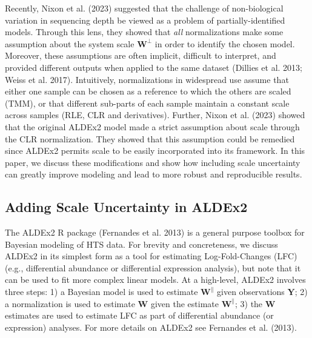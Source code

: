 \documentclass[
]{article}
\begin{document}
Recently, Nixon et al. (2023) suggested that the challenge of
non-biological variation in sequencing depth be viewed as a problem of
partially-identified models. Through this lens, they showed that
\emph{all} normalizations make some assumption about the system scale
\(\mathbf{W}^{\perp}\) in order to identify the chosen model. Moreover,
these assumptions are often implicit, difficult to interpret, and
provided different outputs when applied to the same dataset (Dillies et
al. 2013; Weiss et al. 2017). Intuitively, normalizations in widespread
use assume that either one sample can be chosen as a reference to which
the others are scaled (TMM), or that different sub-parts of each sample
maintain a constant scale across samples (RLE, CLR and derivatives).
Further, Nixon et al. (2023) showed that the original ALDEx2 model made
a strict assumption about scale through the CLR normalization. They
showed that this assumption could be remedied since ALDEx2 permits scale
to be easily incorporated into its framework. In this paper, we discuss
these modifications and show how including scale uncertainty can greatly
improve modeling and lead to more robust and reproducible results.

\hypertarget{adding-scale-uncertainty-in-aldex2}{%
\subsection{Adding Scale Uncertainty in
ALDEx2}\label{adding-scale-uncertainty-in-aldex2}}

The ALDEx2 R package (Fernandes et al. 2013) is a general purpose
toolbox for Bayesian modeling of HTS data. For brevity and concreteness,
we discuss ALDEx2 in its simplest form as a tool for estimating
Log-Fold-Changes (LFC) (e.g., differential abundance or differential
expression analysis), but note that it can be used to fit more complex
linear models. At a high-level, ALDEx2 involves three steps: 1) a
Bayesian model is used to estimate \(\mathbf{W}^{\parallel}\) given
observations \(\mathbf{Y}\); 2) a normalization is used to estimate
\(\mathbf{W}\) given the estimate \(\mathbf{W}^{\parallel}\); 3) the
\(\mathbf{W}\) estimates are used to estimate LFC as part of
differential abundance (or expression) analyses. For more details on
ALDEx2 see Fernandes et al. (2013).
\end{document}
